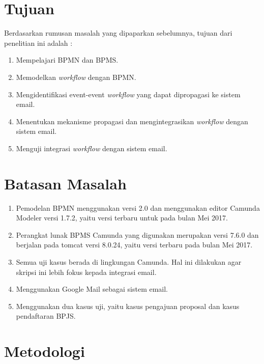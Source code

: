 \section{Tujuan}
\label{sec:tujuan}

Berdasarkan rumusan masalah yang dipaparkan sebelumnya, tujuan dari penelitian ini adalah :
\begin{enumerate}
	\item Mempelajari BPMN dan BPMS.
	\item Memodelkan \textit{workflow} dengan BPMN.
	\item Mengidentifikasi event-event \textit{workflow} yang dapat dipropagasi ke sistem email.
	\item Menentukan mekanisme propagasi dan mengintegrasikan \textit{workflow} dengan sistem email.
	\item Menguji integrasi \textit{workflow} dengan sistem email.
\end{enumerate}




\section{Batasan Masalah}
\label{sec:batasan}
\begin{enumerate}
	\item Pemodelan BPMN menggunakan versi 2.0 dan menggunakan editor Camunda Modeler versi 1.7.2, yaitu versi terbaru untuk pada bulan Mei 2017.
	\item Perangkat lunak BPMS Camunda yang digunakan merupakan versi 7.6.0 dan berjalan pada tomcat versi 8.0.24, yaitu versi terbaru pada bulan Mei 2017.
	\item Semua uji kasus berada di lingkungan Camunda. Hal ini dilakukan agar skripsi ini lebih fokus kepada integrasi email.
	\item Menggunakan Google Mail sebagai sistem email.
	\item Menggunakan dua kasus uji, yaitu kasus pengajuan proposal dan kasus pendaftaran BPJS.
\end{enumerate}




\section{Metodologi}
\label{sec:metlit}

